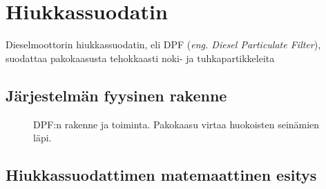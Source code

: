\chapter{Hiukkassuodatin}%
\label{ch:dpf}


Dieselmoottorin hiukkassuodatin, eli DPF (\emph{eng. Diesel Particulate Filter}), suodattaa pakokaasusta tehokkaasti noki- ja tuhkapartikkeleita 


\section{Järjestelmän fyysinen rakenne}

\begin{figure}[H]
    \centering 
    
    \caption{DPF:n rakenne ja toiminta. Pakokaasu virtaa huokoisten seinämien läpi. }
    \label{fig:wall-flow-dpf}
\end{figure}

\section{Hiukkassuodattimen matemaattinen esitys}

\begin{figure}[H]
    \centering 
    
    \caption{}
    \label{fig:}
\end{figure}


